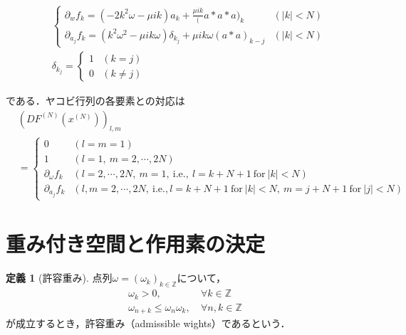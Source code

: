 \documentclass[11pt,a4paper,titlepage]{jsreport}
\theoremstyle{definition}
\newtheorem{dfn}{定義}
\begin{document}
\begin{align*}
   & \begin{cases}
       \partial_w f_k = (-2k^2\omega - \mu ik)a_k + \frac{\mu ik}(a*a*a)_k                     & (|k|<N) \\
       \partial_{a_j} f_k = (k^2\omega^2 - \mu ik\omega)\delta_{k_j} + \mu ik\omega(a*a)_{k-j} & (|k|<N)
     \end{cases}
  \\
   & \delta_{k_j} = \begin{cases}
                      1 & (k=j)     \\
                      0 & (k\neq j)
                    \end{cases}
\end{align*}

である．ヤコビ行列の各要素との対応は
\begin{align*}
   & \left(DF^{(N)}\left(x^{(N)}\right)\right)_{l,m}                                                                                        \\
   & = \begin{cases}
         0                   & \left(l=m=1\right)                                                                                             \\
         1                   & \left(l=1,\ m= 2,\cdots,2N\right)                                                                              \\
         \partial_\omega f_k & \left(l=2,\cdots,2N,\ m=1, \ \mathrm{i.e.},\ l=k+N+1 \ \mathrm{for} \ |k|<N\right)                             \\
         \partial_{a_j}f_k   & \left(l,m=2,\cdots,2N, \ \mathrm{i.e.}, l=k+N+1 \ \mathrm{for} \ |k|<N,\ m=j+N+1 \ \mathrm{for} \ |j|<N\right)
       \end{cases}
\end{align*}


\section{重み付き空間と作用素の決定}
\begin{dfn}[許容重み]
  \label{dfn:許容重み}
  点列$\omega = \left(\omega_k\right)_{k\in\mathbb{Z}}$について，
  \begin{align}
    \omega_k>0,\                           & \forall k \in \mathbb{Z}   \\
    \omega_{n+k} \leq \omega_n \omega_k,\  & \forall n,k\in\mathbb{Z}
  \end{align}
  が成立するとき，許容重み（admissible wights）であるという．
\end{dfn}
\end{document}
